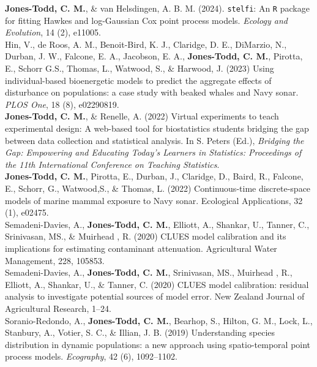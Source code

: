 \documentclass[10pt,a4paper]{moderncv}
\begin{document}
  \textbf{Jones-Todd, C. M.}, \& van Helsdingen, A. B. M. (2024). \texttt{stelfi}: An \texttt{R} package for fitting Hawkes and log-Gaussian Cox point process models. \textit{Ecology and Evolution}, 14 (2), e11005.\\

  Hin, V., de Roos, A. M., Benoit-Bird, K. J., Claridge, D. E., DiMarzio, N.,  Durban, J. W., Falcone, E. A., Jacobson, E. A., \textbf{Jones-Todd, C. M.}, Pirotta, E., Schorr G.S., Thomas, L., Watwood, S., \& Harwood, J. (2023) Using individual-based bioenergetic models to predict the aggregate effects of disturbance on populations: a case study with beaked whales and Navy sonar. \textit{PLOS One}, 18 (8), e02290819.\\

  \textbf{Jones-Todd, C. M.}, \& Renelle, A. (2022) Virtual experiments to teach experimental design: A web-based tool for biostatistics students bridging the gap between data collection and statistical analysis. In S. Peters (Ed.), \textit{Bridging the Gap: Empowering and Educating Today's Learners in Statistics: Proceedings of the 11th International Conference on Teaching Statistics}.\\
  
  \textbf{Jones-Todd, C. M.}, Pirotta, E., Durban, J., Claridge, D., Baird, R., Falcone, E., Schorr, G., Watwood,S., \& Thomas, L.  (2022) Continuous-time discrete-space models of marine mammal exposure to Navy sonar. Ecological Applications, 32 (1), e02475.\\
 
  Semadeni-Davies, A., \textbf{Jones-Todd, C. M.},  Elliott, A., Shankar, U., Tanner, C., Srinivasan, MS., \& Muirhead , R. (2020) CLUES model calibration and its implications for estimating contaminant attenuation. Agricultural Water Management, 228, 105853.\\

    Semadeni-Davies, A., \textbf{Jones-Todd, C. M.}, Srinivasan, MS.,  Muirhead , R.,  Elliott, A., Shankar, U., \& Tanner, C. (2020) CLUES model calibration: residual analysis to investigate potential sources of model error. New Zealand Journal of Agricultural Research, 1--24.\\

 Soranio-Redondo, A., \textbf{Jones-Todd, C. M.}, Bearhop, S., Hilton, G. M., Lock, L., Stanbury, A., Votier, S. C., \& Illian, J. B. (2019) Understanding species distribution in dynamic populations: a new approach using spatio-temporal point process models. \textit{Ecography}, 42 (6), 1092--1102.\\
  
\end{document}
